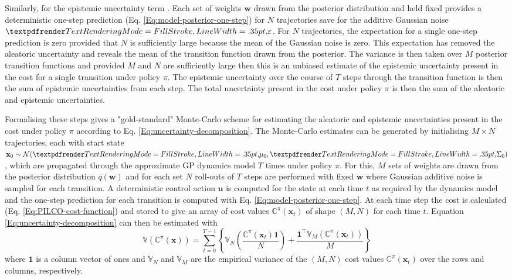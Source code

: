 Similarly, for the epistemic uncertainty term . Each set of weights $\mathbf{w}$ drawn from the posterior distribution and held fixed provides a deterministic one-step prediction (Eq. \ref{Eq:model-posterior-one-step}) for $N$ trajectories save for the additive Gaussian noise $\boldgreek{\varepsilon}$. For $N$ trajectories, the expectation for a single one-step prediction is zero provided that $N$ is sufficiently large because the mean of the Gaussian noise is zero. This expectation has removed the aleatoric uncertainty and reveals the mean of the transition function drawn from the posterior. The variance is then taken over $M$ posterior transition functions and provided $M$ and $N$ are sufficiently large then this is an unbiased estimate of the epistemic uncertainty present in the cost for a single transition under policy $\pi$. The epistemic uncertainty over the course of $T$ steps through the transition function is then the sum of epistemic uncertainties from each step. The total uncertainty present in the cost under policy $\pi$ is then the sum of the aleatoric and epistemic uncertainties.

Formalising these steps gives a "gold-standard" Monte-Carlo scheme for estimating the aleatoric and epistemic uncertainties present in the cost under policy $\pi$ according to Eq. \ref{Eq:uncertainty-decomposition}. The Monte-Carlo estimates can be generated by initialising $M\times N$ trajectories, each with start state $\mathbf{x}_{0} \sim \mathcal{N}(\boldgreek{\mu}_{0},\boldgreek{\Sigma}_{0})$, which are propagated through the approximate GP dynamics model $T$ times under policy $\pi$. For this, $M$ sets of weights are drawn from the posterior distribution $q(\mathbf{w})$ and for each set $N$ roll-outs of $T$ steps are performed with fixed $\mathbf{w}$ where Gaussian additive noise is sampled for each transition. A deterministic control action $\mathbf{u}$ is computed for the state at each time $t$ as required by the dynamics model and the one-step prediction for each transition is computed with Eq. \ref{Eq:model-posterior-one-step}. At each time step the cost is calculated (Eq. \ref{Eq:PILCO-cost-function}) and stored to give an array of cost values $\mathbb{C}^{\pi}(\mathbf{x}_t)$ of shape $(M,N)$ for each time $t$. Equation \ref{Eq:uncertainty-decomposition} can then be estimated with
\begin{equation}
    \mathbb{V}(\mathbb{C}^{\pi}(\mathbf{x}))=\sum^{T-1}_{t=0}\left\{\mathbb{V}_{N}\left(\frac{\mathbb{C}^{\pi}(\mathbf{x}_{t})\mathbf{1}}{N}\right)+\frac{\mathbf{1}^{\top}\mathbb{V}_{M}\left(\mathbb{C}^{\pi}(\mathbf{x}_{t})\right)}{M}\right\}
    \label{Eq:MC-uncertainty-decomposition}
\end{equation}
where $\mathbf{1}$ is a column vector of ones and $\mathbb{V}_{N}$ and $\mathbb{V}_{M}$ are the empirical variance of the $(M,N)$ cost values $\mathbb{C}^{\pi}(\mathbf{x}_t)$ over the rows and columns, respectively.

